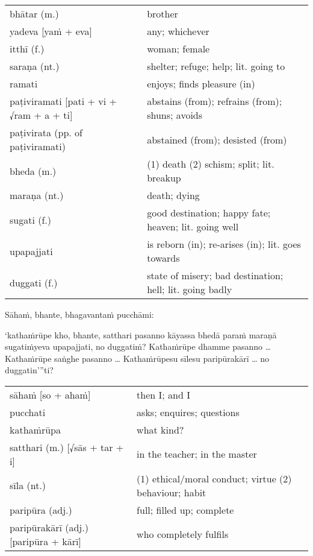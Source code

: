 \documentclass[11pt,oneside]{memoir}
\begin{document}
\begin{longtable}{L{\colOne} L{\colTwo}}
bhātar (m.) & brother\\[0pt]
yadeva [yaṁ + eva] & any; whichever\\[0pt]
itthī (f.) & woman; female\\[0pt]
saraṇa (nt.) & shelter; refuge; help; lit. going to\\[0pt]
ramati & enjoys; finds pleasure (in)\\[0pt]
paṭiviramati [pati + vi + √ram + a + ti] & abstains (from); refrains (from); shuns; avoids\\[0pt]
paṭivirata (pp. of paṭiviramati) & abstained (from); desisted (from)\\[0pt]
bheda (m.) & (1) death (2) schism; split; lit. breakup\\[0pt]
maraṇa (nt.) & death; dying\\[0pt]
sugati (f.) & good destination; happy fate; heaven; lit. going well\\[0pt]
upapajjati & is reborn (in); re-arises (in); lit. goes towards\\[0pt]
duggati (f.) & state of misery; bad destination; hell; lit. going badly\\[0pt]
\end{longtable}

\clearpage

\begin{spacedquote}
Sāhaṁ, bhante, bhagavantaṁ pucchāmi:

‘kathaṁrūpe kho, bhante, satthari pasanno
kāyassa bhedā paraṁ maraṇā sugatiṁyeva upapajjati, no duggatiṁ?
Kathaṁrūpe dhamme pasanno \ldots{}
Kathaṁrūpe saṅghe pasanno \ldots{}
Kathaṁrūpesu sīlesu paripūrakārī \ldots{} no duggatin’”ti?
\end{spacedquote}

\begin{longtable}{L{\colOne} L{\colTwo}}
sāhaṁ [so + ahaṁ] & then I; and I\\[0pt]
pucchati & asks; enquires; questions\\[0pt]
kathaṁrūpa & what kind?\\[0pt]
satthari (m.) [√sās + tar + i] & in the teacher; in the master\\[0pt]
sīla (nt.) & (1) ethical/moral conduct; virtue (2) behaviour; habit\\[0pt]
paripūra (adj.) & full; filled up; complete\\[0pt]
paripūrakārī (adj.) [paripūra + kārī] & who completely fulfils\\[0pt]
\end{longtable}
\end{document}
